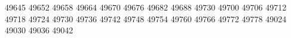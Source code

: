 49645
49652
49658
49664
49670
49676
49682
49688
49730
49700
49706
49712
49718
49724
49730
49736
49742
49748
49754
49760
49766
49772
49778
49024
49030
49036
49042
